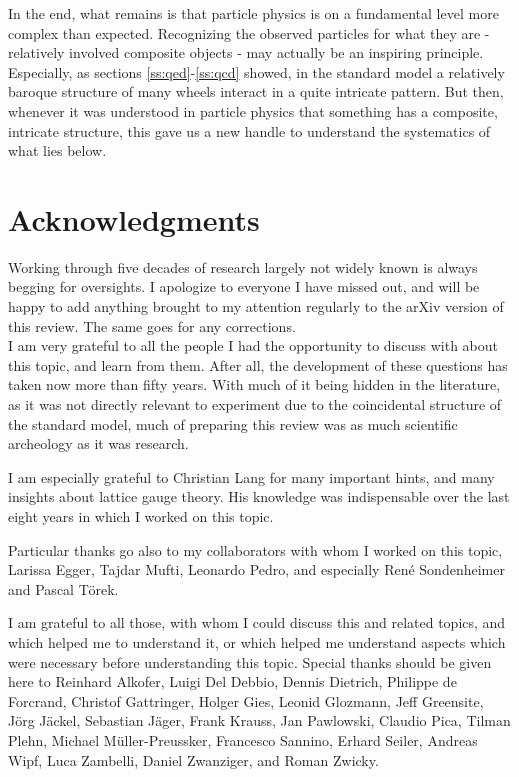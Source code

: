\documentclass[final,12pt,3p,longtitle]{elsarticle}
\newcommand*{\1}{1\!\!\!\bot}
\begin{document}
In the end, what remains is that particle physics is on a fundamental level more complex than expected. Recognizing the observed particles for what they are - relatively involved composite objects - may actually be an inspiring principle. Especially, as sections \ref{ss:qed}-\ref{ss:qcd} showed, in the standard model a relatively baroque structure of many wheels interact in a quite intricate pattern. But then, whenever it was understood in particle physics that something has a composite, intricate structure, this gave us a new handle to understand the systematics of what lies below.

\section*{Acknowledgments}

Working through five decades of research largely not widely known is always begging for oversights. I apologize to everyone I have missed out, and will be happy to add anything brought to my attention regularly to the arXiv version of this review. The same goes for any corrections.\\

I am very grateful to all the people I had the opportunity to discuss with about this topic, and learn from them. After all, the development of these questions has taken now more than fifty years. With much of it being hidden in the literature, as it was not directly relevant to experiment due to the coincidental structure of the standard model, much of preparing this review was as much scientific archeology as it was research.

I am especially grateful to Christian Lang for many important hints, and many insights about lattice gauge theory. His knowledge was indispensable over the last eight years in which I worked on this topic.

Particular thanks go also to my collaborators with whom I worked on this topic, Larissa Egger, Tajdar Mufti, Leonardo Pedro, and especially Ren\'e Sondenheimer and Pascal T\"orek.

I am grateful to all those, with whom I could discuss this and related topics, and which helped me to understand it, or which helped me understand aspects which were necessary before understanding this topic. Special thanks should be given here to Reinhard Alkofer, Luigi Del Debbio, Dennis Dietrich, Philippe de Forcrand, Christof Gattringer, Holger Gies, Leonid Glozmann, Jeff Greensite, J\"org J\"ackel, Sebastian J\"ager, Frank Krauss, Jan Pawlowski, Claudio Pica, Tilman Plehn, Michael M\"uller-Preussker, Francesco Sannino, Erhard Seiler, Andreas Wipf, Luca Zambelli, Daniel Zwanziger, and Roman Zwicky.
\end{document}
